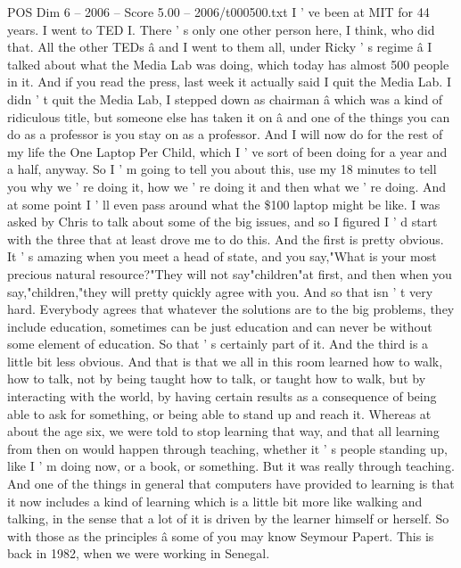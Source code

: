 \begin{textsample}{POS Dim 6 – 2006 – Score 5.00 – 2006/t000500.txt}  \label{ex:f6_pos_008}
I ' ve been at MIT for 44 years.
I went to TED I.
There ' s only one other person here, I think, who did that.
All the other TEDs â and I went to them all, under Ricky ' s regime â I talked about what the Media Lab was doing, which today has almost 500 people in it.
And if you read the press, last week it actually said I quit the Media Lab.
I didn ' t quit the Media Lab, I stepped down as chairman â which was a kind of ridiculous title, but someone else has taken it on â and one of the things you can do as a professor is you stay on as a professor.
And I will now do for the rest of my life the One Laptop Per Child, which I ' ve sort of been doing for a year and a half, anyway.
So I ' m going to tell you about this, use my 18 minutes to tell you why we ' re doing it, how we ' re doing it and then what we ' re doing.
And at some point I ' ll even pass around what the \$100 laptop might be like.
I was asked by Chris to talk about some of the big issues, and so I figured I ' d start with the three that at least drove me to do this.
And the first is pretty obvious.
It ' s amazing when you meet a head of state, and you say,"What is your most precious natural resource?"They will not say"children"at first, and then when you say,"children,"they will pretty quickly agree with you.
And so that isn ' t very hard.
Everybody agrees that whatever the solutions are to the big problems, they include education, sometimes can be just education and can never be without some element of education.
So that ' s certainly part of it.
And the third is a little bit less obvious.
And that is that we all in this room learned how to walk, how to talk, not by being taught how to talk, or taught how to walk, but by interacting with the world, by having certain results as a consequence of being able to ask for something, or being able to stand up and reach it.
Whereas at about the age six, we were told to stop learning that way, and that all learning from then on would happen through teaching, whether it ' s people standing up, like I ' m doing now, or a book, or something.
But it was really through teaching.
And one of the things in general that computers have provided to learning is that it now includes a kind of learning which is a little bit more like walking and talking, in the sense that a lot of it is driven by the learner himself or herself.
So with those as the principles â some of you may know Seymour Papert.
This is back in 1982, when we were working in Senegal.

\end{textsample}
